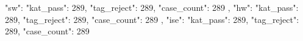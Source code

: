 \begin{codeblock}
{
  "sw": {
    "kat_pass": 289,
    "tag_reject": 289,
    "case_count": 289
  },
  "hw": {
    "kat_pass": 289,
    "tag_reject": 289,
    "case_count": 289
  },
  "ise": {
    "kat_pass": 289,
    "tag_reject": 289,
    "case_count": 289
  }
}
\end{codeblock}
